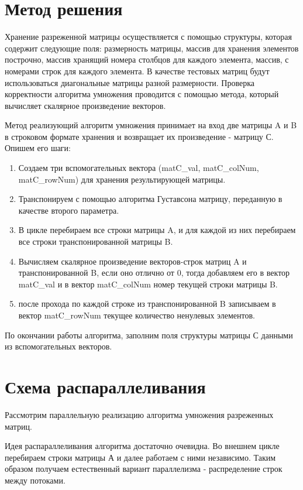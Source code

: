 \documentclass{report}
\begin{document}
\section*{Метод решения}
Хранение разреженной матрицы осуществляется с помощью структуры, которая содержит следующие поля: размерность матрицы, массив для хранения элементов построчно, массив хранящий номера столбцов для каждого элемента, массив, с номерами строк для каждого элемента. В качестве тестовых матриц будут использоваться диагональные матрицы разной размерности. Проверка корректности алгоритма умножения проводится с помощью метода, который вычисляет скалярное произведение векторов.

\par Метод реализующий алгоритм умножения принимает на вход две матрицы A и B в строковом формате хранения и возвращает их произведение - матрицу С. Опишем его шаги:
\begin{enumerate}
\item Создаем три вспомогательных вектора (matC\_val, matC\_colNum, matC\_rowNum) для хранения результирующей матрицы.
\item Транспонируем с помощью алгоритма Густавсона матрицу, переданную в качестве второго параметра.
\item В цикле перебираем все строки матрицы A, и для каждой из них перебираем все строки транспонированной матрицы B.
\item Вычисляем скалярное произведение векторов-строк матриц A и транспонированной B, если оно отлично от 0, тогда
добавляем его в вектор matC\_val и в вектор matC\_colNum номер текущей строки матрицы B.
\item после прохода по каждой строке из транспонированной B записываем в вектор matC\_rowNum текущее количество ненулевых элементов.
\end{enumerate}
По окончании работы алгоритма, заполним поля структуры матрицы С данными из вспомогательных векторов.

\newpage

\section*{Схема распараллеливания}
Рассмотрим параллельную реализацию алгоритма умножения разреженных матриц.

\par Идея распараллеливания алгоритма достаточно очевидна. Во внешнем цикле перебираем строки матрицы А и далее работаем с ними независимо. Таким образом получаем естественный вариант параллелизма - распределение строк между потоками.
\end{document}
